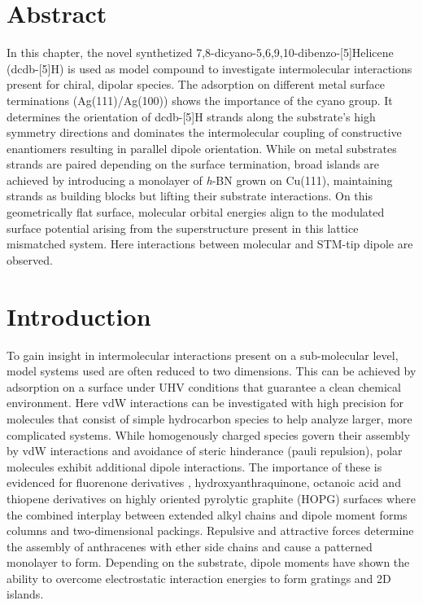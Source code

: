 \label{section:helicene}
\section{Abstract}

In this chapter, the novel synthetized 7,8-dicyano-5,6,9,10-dibenzo-[5]Helicene (dcdb-[5]H) is used as model compound to investigate intermolecular interactions present for chiral, dipolar species. The adsorption on different metal surface terminations (Ag(111)/Ag(100)) shows the importance of the cyano group. It determines the orientation of dcdb-[5]H strands along the substrate's high symmetry directions and dominates the intermolecular coupling of constructive enantiomers resulting in parallel dipole orientation. While on metal substrates strands are paired depending on the surface termination, broad islands are achieved by introducing a monolayer of \textit{h}-BN grown on Cu(111), maintaining strands as building blocks but lifting their substrate interactions. On this geometrically flat surface, molecular orbital energies align to the modulated surface potential arising from the superstructure present in this lattice mismatched system. Here interactions between molecular and STM-tip dipole are observed.

\section{Introduction}

To gain insight in intermolecular interactions present on a sub-molecular level, model systems used are often reduced to two dimensions. This can be achieved by adsorption on a surface under UHV conditions that guarantee a clean chemical environment. Here vdW interactions can be investigated with high precision for molecules that consist of simple hydrocarbon species to help analyze larger, more complicated systems. 
While homogenously charged species govern their assembly by vdW interactions and avoidance of steric hinderance (pauli repulsion), polar molecules exhibit additional dipole interactions. The importance of these is evidenced for fluorenone derivatives \cite{Cui_Self-assembly_2015, Xu_Dipole-controlled_2013, Xu_Two-dimensional_2012}, hydroxyanthraquinone\cite{Hu_Structural_2016}, octanoic acid \cite{Hu_Effects_2017} and thiopene derivatives \cite{Heller_Self-assemlby_2012} on highly oriented pyrolytic graphite (HOPG) surfaces where the combined interplay between extended alkyl chains and dipole moment forms columns and two-dimensional packings. Repulsive and attractive forces determine the assembly of anthracenes with ether side chains and cause a patterned monolayer to form\cite{Wei_Dipolar-control_2006}.  Depending on the substrate, dipole moments have shown the ability to overcome electrostatic interaction energies to form gratings and 2D islands.\cite{Kunkel_Self-assembly_2015}

